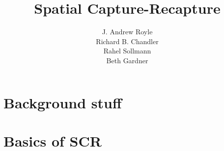 \documentclass{book}
\begin{document}
\title{ Spatial Capture-Recapture  }
\subtitle{
}
\author{J. Andrew Royle \\
Richard B. Chandler \\
Rahel Sollmann \\
Beth Gardner}


\address{
USGS Patuxent Wildlife Research Center \\
North Carolina State University
}

\maketitle

\newpage

\setcounter{tocdepth}{0}
\tableofcontents

\part{Background stuff}









\part{Basics of SCR}








\end{document}
